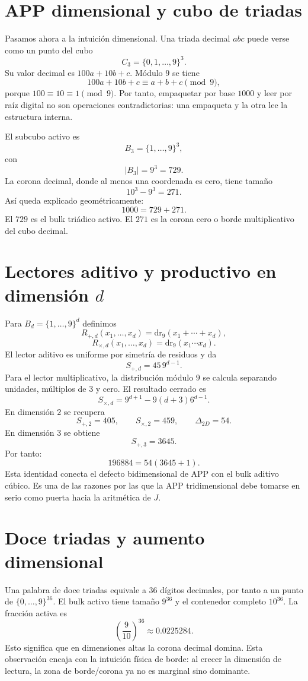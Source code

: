 \documentclass[11pt,a4paper]{article}
\newcommand{\dr}{\mathrm{dr}_9}
\begin{document}
\section{APP dimensional y cubo de triadas}
Pasamos ahora a la intuición dimensional. Una triada decimal $abc$ puede verse como un punto del cubo
\[
C_3=\{0,1,\ldots,9\}^3.
\]
Su valor decimal es $100a+10b+c$. Módulo $9$ se tiene
\[
100a+10b+c\equiv a+b+c\pmod9,
\]
porque $100\equiv10\equiv1\pmod9$. Por tanto, empaquetar por base $1000$ y leer por raíz digital no son operaciones contradictorias: una empaqueta y la otra lee la estructura interna.

El subcubo activo es
\[
B_3=\{1,\ldots,9\}^3,
\]
con
\[
|B_3|=9^3=729.
\]
La corona decimal, donde al menos una coordenada es cero, tiene tamaño
\[
10^3-9^3=271.
\]
Así queda explicado geométricamente:
\[
\boxed{1000=729+271.}
\]
El $729$ es el bulk triádico activo. El $271$ es la corona cero o borde multiplicativo del cubo decimal.

\section{Lectores aditivo y productivo en dimensión $d$}
Para $B_d=\{1,\ldots,9\}^d$ definimos
\[
R_{+,d}(x_1,\ldots,x_d)=\dr(x_1+\cdots+x_d),
\]
\[
R_{\times,d}(x_1,\ldots,x_d)=\dr(x_1\cdots x_d).
\]
El lector aditivo es uniforme por simetría de residuos y da
\[
S_{+,d}=45\,9^{d-1}.
\]
Para el lector multiplicativo, la distribución módulo $9$ se calcula separando unidades, múltiplos de $3$ y cero. El resultado cerrado es
\[
S_{\times,d}=9^{d+1}-9(d+3)6^{d-1}.
\]
En dimensión $2$ se recupera
\[
S_{+,2}=405,
\qquad
S_{\times,2}=459,
\qquad
\Delta_{2D}=54.
\]
En dimensión $3$ se obtiene
\[
S_{+,3}=3645.
\]
Por tanto:
\[
\boxed{196884=54(3645+1).}
\]
Esta identidad conecta el defecto bidimensional de APP con el bulk aditivo cúbico. Es una de las razones por las que la APP tridimensional debe tomarse en serio como puerta hacia la aritmética de $J$.

\section{Doce triadas y aumento dimensional}
Una palabra de doce triadas equivale a $36$ dígitos decimales, por tanto a un punto de $\{0,\ldots,9\}^{36}$. El bulk activo tiene tamaño $9^{36}$ y el contenedor completo $10^{36}$. La fracción activa es
\[
\left(\frac9{10}\right)^{36}\approx 0.0225284.
\]
Esto significa que en dimensiones altas la corona decimal domina. Esta observación encaja con la intuición física de borde: al crecer la dimensión de lectura, la zona de borde/corona ya no es marginal sino dominante.
\end{document}
